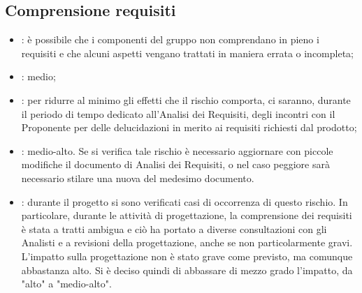 \subsection{Comprensione requisiti}
\begin{itemize}
\item {}: è possibile che i componenti del gruppo non comprendano in pieno i requisiti e che alcuni aspetti vengano trattati in maniera errata o incompleta;
\item {}: medio;
\item {}: per ridurre al minimo gli effetti che il rischio comporta, ci saranno, durante il periodo di tempo dedicato all'Analisi dei Requisiti, degli incontri con il Proponente per delle delucidazioni in merito ai requisiti richiesti dal prodotto;
\item {}: medio-alto. Se si verifica tale rischio è necessario aggiornare con piccole modifiche il documento di Analisi dei Requisiti, o nel caso peggiore sarà necessario stilare una nuova  del medesimo documento.
\item {}: durante il progetto si sono verificati casi di occorrenza di questo rischio. In particolare, durante le attività di progettazione, la comprensione dei requisiti è stata a tratti ambigua e ciò ha portato a diverse consultazioni con gli Analisti e a revisioni della progettazione, anche se non particolarmente gravi. L'impatto sulla progettazione non è stato grave come previsto, ma comunque abbastanza alto. Si è deciso quindi di abbassare di mezzo grado l'impatto, da "alto" a "medio-alto".
\end{itemize}

